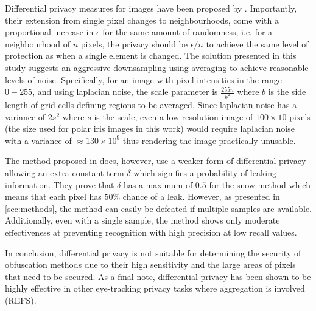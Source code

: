 Differential privacy measures for images have been proposed by \parencite{fan2018image}. Importantly, their extension from single pixel changes to neighbourhoods, come with a proportional increase in $\epsilon$ for the same amount of randomness, i.e. for a neighbourhood of $n$ pixels, the privacy should be $\epsilon/n$ to achieve the same level of protection as when a single element is changed. The solution presented in this study suggests an aggressive downsampling using averaging to achieve reasonable levels of noise. Specifically, for an image with pixel intensities in the range $0-255$, and using laplacian noise, the scale parameter is $\frac{255n}{b^2}$ where $b$ is the side length of grid cells defining regions to be averaged. Since laplacian noise has a variance of $2s^2$ where $s$ is the scale, even a low-resolution image of $100\times 10$ pixels (the size used for polar iris images in this work) would require laplacian noise with a variance of $\approx 130\times 10^9$ thus rendering the image practically unusable.

The method proposed in \parencite{BRENDAN_SNOW} does, however, use a weaker form of differential privacy allowing an extra constant term $\delta$ which signifies a probability of leaking information. They prove that $\delta$ has a maximum of $0.5$ for the snow method which means that each pixel has $50\%$ chance of a leak. However, as presented in \cref{sec:methods}, the method can easily be defeated if multiple samples are available. Additionally, even with a single sample, the method shows only moderate effectiveness at preventing recognition with high precision at low recall values. 

In conclusion, differential privacy is not suitable for determining the security of obfuscation methods due to their high sensitivity and the large areas of pixels that need to be secured. As a final note, differential privacy has been shown to be highly effective in other eye-tracking privacy tasks where aggregation is involved (REFS).



